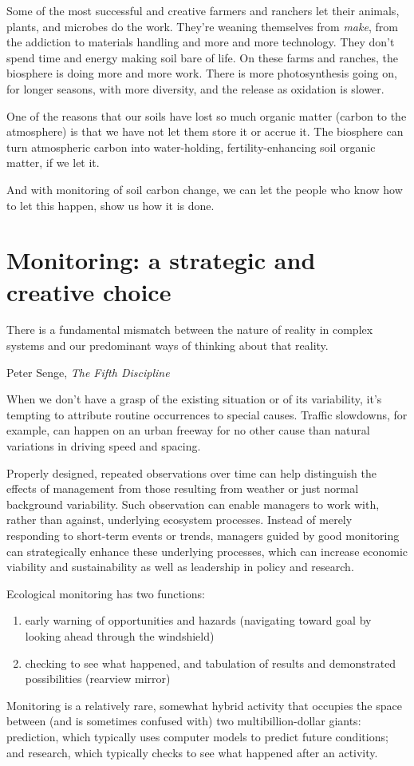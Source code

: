 \documentclass[11pt,letterpaper,oneside,onecolumn]{memoir}
\begin{document}
Some of the most successful and creative farmers and ranchers let their animals, plants, and microbes do the work. They're weaning themselves from \textit{make}, from the addiction to materials handling and more and more technology. They don't spend time and energy making soil bare of life. On these farms and ranches, the biosphere is doing more and more work. There is more photosynthesis going on, for longer seasons, with more diversity, and the release as oxidation is slower.

One of the reasons that our soils have lost so much organic matter (carbon to the atmosphere) is that we have not let them store it or accrue it. The biosphere can turn atmospheric carbon into water-holding, fertility-enhancing soil organic matter, if we let it.

And with monitoring of soil carbon change, we can let the people who know how to let this happen, show us how it is done.

\section{Monitoring: a strategic and creative choice}

\epigraph{There is a fundamental mismatch between the nature of reality in complex systems and our predominant ways of thinking about that reality.}{Peter Senge, \textit{The Fifth Discipline}}

\noindent When we don't have a grasp of the existing situation or of its variability, it's tempting to attribute routine occurrences to special causes. Traffic slowdowns, for example, can happen on an urban freeway for no other cause than natural variations in driving speed and spacing.

Properly designed, repeated observations over time can help distinguish the effects of management from those resulting from weather or just normal background variability. Such observation can enable managers to work with, rather than against, underlying ecosystem processes. Instead of merely responding to short-term events or trends, managers guided by good monitoring can strategically enhance these underlying processes, which can increase economic viability and sustainability as well as leadership in policy and research.

Ecological monitoring has two functions:
\begin{enumerate}
\item early warning of opportunities and hazards (navigating toward goal by looking ahead through the windshield)

\item checking to see what happened, and tabulation of results and demonstrated possibilities (rearview mirror)
\end{enumerate}
Monitoring is a relatively rare, somewhat hybrid activity that occupies the space between (and is sometimes confused with) two multibillion-dollar giants: prediction, which typically uses computer models to predict future conditions; and research, which typically checks to see what happened after an activity.
\end{document}
